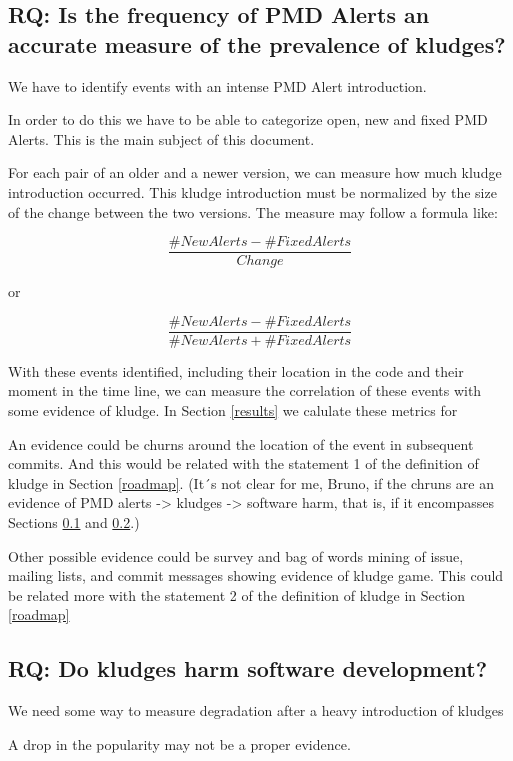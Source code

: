 \documentclass[
]{article}
\begin{document}
\subsection{RQ: Is the frequency of PMD Alerts an accurate measure of the prevalence of kludges?} \label{PMD_Kludge}

We have to identify events with an intense PMD Alert introduction.

In order to do this we have to be able to categorize open, new and fixed
PMD Alerts. This is the main subject of this document.

For each pair of an older and a newer version, we can measure how much
kludge introduction occurred. This kludge introduction must be
normalized by the size of the change between the two versions. The
measure may follow a formula like:

\[ \frac{\#NewAlerts - \#FixedAlerts}{Change}    \]

or

\[ \frac{\#NewAlerts - \#FixedAlerts}{\#NewAlerts + \#FixedAlerts}    \]

With these events identified, including their location in the code and
their moment in the time line, we can measure the correlation of these
events with some evidence of kludge. In Section \ref{results} we
calulate these metrics for

An evidence could be churns around the location of the event in
subsequent commits. And this would be related with the statement 1 of
the definition of kludge in Section \ref{roadmap}. (It´s not clear for
me, Bruno, if the chruns are an evidence of PMD alerts -\textgreater{}
kludges -\textgreater{} software harm, that is, if it encompasses
Sections \ref{PMD_Kludge} and \ref{kludge_harm}.)

Other possible evidence could be survey and bag of words mining of
issue, mailing lists, and commit messages showing evidence of kludge
game. This could be related more with the statement 2 of the definition
of kludge in Section \ref{roadmap}

\subsection{RQ: Do kludges harm software development?} \label{kludge_harm}

We need some way to measure degradation after a heavy introduction of
kludges

A drop in the popularity may not be a proper evidence.
\end{document}
